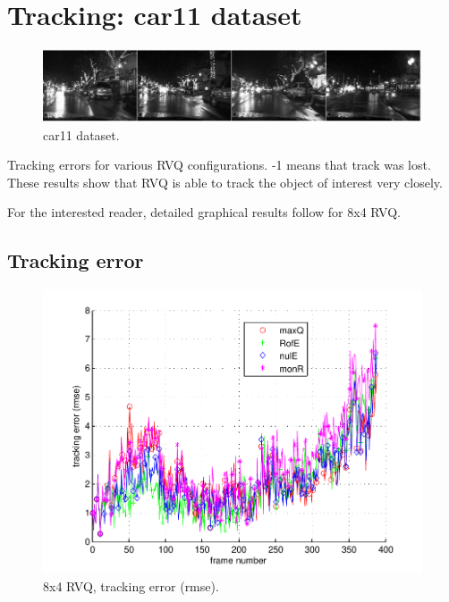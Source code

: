 \clearpage
\newpage
\section{Tracking: car11 dataset} 
								\begin{figure}[h!]
								\centering
								\includegraphics[width=1.0\textwidth]{thesis/seq_7_car11.png}
								\caption{car11 dataset.}
								\label{fig:seq_7_car11}
								\end{figure}



\begin{table}[h]
\centering

\caption{Tracking errors for various RVQ configurations.  -1 means that track was lost.  These results show that RVQ is able to track the object of interest very closely.}
\end{table}

For the interested reader, detailed graphical results follow for 8x4 RVQ.
\clearpage
\newpage
\subsection{Tracking error}

								\begin{figure}[h!]
								\centering
								\includegraphics[height=0.38\textheight]{thesis/7_car11_8_4_1000_trk_rmse.pdf}
								\caption{8x4 RVQ, tracking error (rmse).}
								\label{fig:7_car11_8_4_1000_trk_rmse}
								\end{figure}


